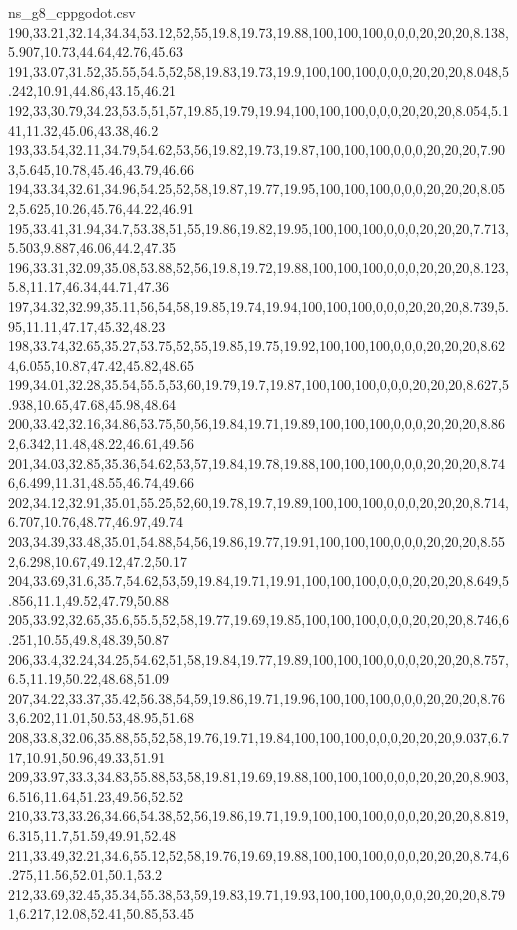 \begin{filecontents*}[overwrite]{ns_g8_cppgodot.csv}
190,33.21,32.14,34.34,53.12,52,55,19.8,19.73,19.88,100,100,100,0,0,0,20,20,20,8.138,5.907,10.73,44.64,42.76,45.63
191,33.07,31.52,35.55,54.5,52,58,19.83,19.73,19.9,100,100,100,0,0,0,20,20,20,8.048,5.242,10.91,44.86,43.15,46.21
192,33,30.79,34.23,53.5,51,57,19.85,19.79,19.94,100,100,100,0,0,0,20,20,20,8.054,5.141,11.32,45.06,43.38,46.2
193,33.54,32.11,34.79,54.62,53,56,19.82,19.73,19.87,100,100,100,0,0,0,20,20,20,7.903,5.645,10.78,45.46,43.79,46.66
194,33.34,32.61,34.96,54.25,52,58,19.87,19.77,19.95,100,100,100,0,0,0,20,20,20,8.052,5.625,10.26,45.76,44.22,46.91
195,33.41,31.94,34.7,53.38,51,55,19.86,19.82,19.95,100,100,100,0,0,0,20,20,20,7.713,5.503,9.887,46.06,44.2,47.35
196,33.31,32.09,35.08,53.88,52,56,19.8,19.72,19.88,100,100,100,0,0,0,20,20,20,8.123,5.8,11.17,46.34,44.71,47.36
197,34.32,32.99,35.11,56,54,58,19.85,19.74,19.94,100,100,100,0,0,0,20,20,20,8.739,5.95,11.11,47.17,45.32,48.23
198,33.74,32.65,35.27,53.75,52,55,19.85,19.75,19.92,100,100,100,0,0,0,20,20,20,8.624,6.055,10.87,47.42,45.82,48.65
199,34.01,32.28,35.54,55.5,53,60,19.79,19.7,19.87,100,100,100,0,0,0,20,20,20,8.627,5.938,10.65,47.68,45.98,48.64
200,33.42,32.16,34.86,53.75,50,56,19.84,19.71,19.89,100,100,100,0,0,0,20,20,20,8.862,6.342,11.48,48.22,46.61,49.56
201,34.03,32.85,35.36,54.62,53,57,19.84,19.78,19.88,100,100,100,0,0,0,20,20,20,8.746,6.499,11.31,48.55,46.74,49.66
202,34.12,32.91,35.01,55.25,52,60,19.78,19.7,19.89,100,100,100,0,0,0,20,20,20,8.714,6.707,10.76,48.77,46.97,49.74
203,34.39,33.48,35.01,54.88,54,56,19.86,19.77,19.91,100,100,100,0,0,0,20,20,20,8.552,6.298,10.67,49.12,47.2,50.17
204,33.69,31.6,35.7,54.62,53,59,19.84,19.71,19.91,100,100,100,0,0,0,20,20,20,8.649,5.856,11.1,49.52,47.79,50.88
205,33.92,32.65,35.6,55.5,52,58,19.77,19.69,19.85,100,100,100,0,0,0,20,20,20,8.746,6.251,10.55,49.8,48.39,50.87
206,33.4,32.24,34.25,54.62,51,58,19.84,19.77,19.89,100,100,100,0,0,0,20,20,20,8.757,6.5,11.19,50.22,48.68,51.09
207,34.22,33.37,35.42,56.38,54,59,19.86,19.71,19.96,100,100,100,0,0,0,20,20,20,8.763,6.202,11.01,50.53,48.95,51.68
208,33.8,32.06,35.88,55,52,58,19.76,19.71,19.84,100,100,100,0,0,0,20,20,20,9.037,6.717,10.91,50.96,49.33,51.91
209,33.97,33.3,34.83,55.88,53,58,19.81,19.69,19.88,100,100,100,0,0,0,20,20,20,8.903,6.516,11.64,51.23,49.56,52.52
210,33.73,33.26,34.66,54.38,52,56,19.86,19.71,19.9,100,100,100,0,0,0,20,20,20,8.819,6.315,11.7,51.59,49.91,52.48
211,33.49,32.21,34.6,55.12,52,58,19.76,19.69,19.88,100,100,100,0,0,0,20,20,20,8.74,6.275,11.56,52.01,50.1,53.2
212,33.69,32.45,35.34,55.38,53,59,19.83,19.71,19.93,100,100,100,0,0,0,20,20,20,8.791,6.217,12.08,52.41,50.85,53.45

\end{filecontents*}
